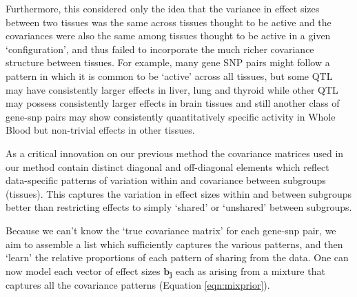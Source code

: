Furthermore, this considered only the idea that the variance in effect sizes between two tissues was the same across tissues thought to be active and the covariances were also the same among tissues thought to be active in a given `configuration',  and thus failed to incorporate the much richer covariance structure between tissues. For example, many gene SNP pairs might follow a pattern in which it is common to be `active' across all tissues, but some QTL may have consistently larger effects in liver, lung and thyroid while other QTL may possess consistently larger effects in brain tissues and still another class of gene-snp pairs may show consistently quantitatively specific activity in Whole Blood but non-trivial effects in other tissues. 

As a critical innovation on our previous method \cite{flutre_statistical_2013,wen_bayesian_2014} the covariance matrices used in our method contain distinct diagonal and off-diagonal elements which reflect data-specific patterns of variation within and covariance between subgroups (tissues). This captures the variation in effect sizes within and between subgroups better than restricting effects to simply `shared' or `unshared' between subgroups. 
 
Because we can't know the `true covariance matrix' for each gene-snp pair, we aim to assemble a list which sufficiently captures the various patterns, and then `learn' the relative proportions of each pattern of sharing from the data. One can now model each vector of effect sizes $\bm{b_{j}}$ each as arising from a mixture that captures all the covariance patterns (Equation \ref{eqn:mixprior}).

